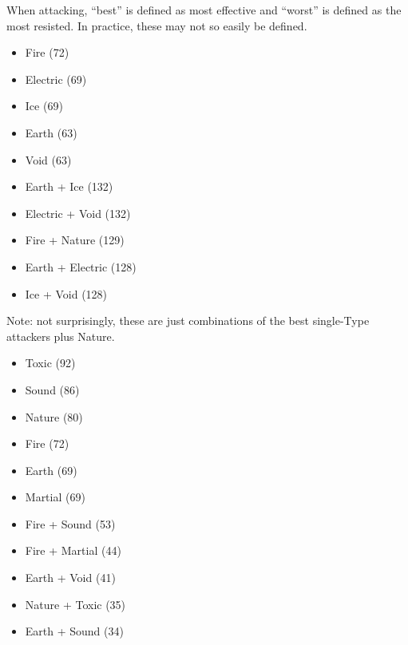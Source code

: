 When attacking, ``best'' is defined as most effective and ``worst'' is defined as the most resisted. In practice, these may not so easily be defined.




\begin{itemize}
	\item{Fire (72)}
	\item{Electric (69)}
	\item{Ice (69)}
	\item{Earth (63)}
	\item{Void (63)}
\end{itemize}


\begin{itemize}
	\item{Earth + Ice (132)}
	\item{Electric + Void (132)}
	\item{Fire + Nature (129)}
	\item{Earth + Electric (128)}
	\item{Ice + Void (128)}
\end{itemize}

\noindent Note: not surprisingly, these are just combinations of the best single-Type attackers plus Nature.


\begin{itemize}
	\item{Toxic (92)}
	\item{Sound (86)}
	\item{Nature (80)}
	\item{Fire (72)}
	\item{Earth (69)}
	\item{Martial (69)}
\end{itemize}

\begin{itemize}
	\item{Fire + Sound (53)}
	\item{Fire + Martial (44)}
	\item{Earth + Void (41)}
	\item{Nature + Toxic (35)}
	\item{Earth + Sound (34)}
\end{itemize}

